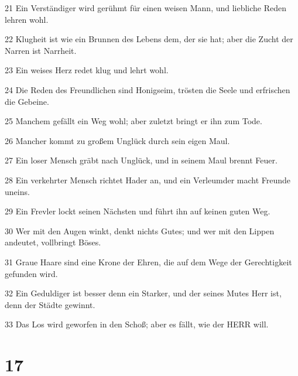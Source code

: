 \par 21 Ein Verständiger wird gerühmt für einen weisen Mann, und liebliche Reden lehren wohl.
\par 22 Klugheit ist wie ein Brunnen des Lebens dem, der sie hat; aber die Zucht der Narren ist Narrheit.
\par 23 Ein weises Herz redet klug und lehrt wohl.
\par 24 Die Reden des Freundlichen sind Honigseim, trösten die Seele und erfrischen die Gebeine.
\par 25 Manchem gefällt ein Weg wohl; aber zuletzt bringt er ihn zum Tode.
\par 26 Mancher kommt zu großem Unglück durch sein eigen Maul.
\par 27 Ein loser Mensch gräbt nach Unglück, und in seinem Maul brennt Feuer.
\par 28 Ein verkehrter Mensch richtet Hader an, und ein Verleumder macht Freunde uneins.
\par 29 Ein Frevler lockt seinen Nächsten und führt ihn auf keinen guten Weg.
\par 30 Wer mit den Augen winkt, denkt nichts Gutes; und wer mit den Lippen andeutet, vollbringt Böses.
\par 31 Graue Haare sind eine Krone der Ehren, die auf dem Wege der Gerechtigkeit gefunden wird.
\par 32 Ein Geduldiger ist besser denn ein Starker, und der seines Mutes Herr ist, denn der Städte gewinnt.
\par 33 Das Los wird geworfen in den Schoß; aber es fällt, wie der HERR will.

\chapter{17}

